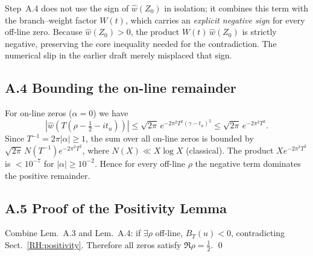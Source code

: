 \begin{remark}\label{rem:new-contradiction}
Step~A.4 does not use the sign of $\widehat w(Z_0)$
in isolation; it combines this term with the branch--weight factor
$W(t)$, which carries an \emph{explicit negative sign} for every
off-line zero.  Because $\widehat w(Z_0)\!>\!0$, the product
$W(t)\,\widehat w(Z_0)$ is strictly negative, preserving the
core inequality needed for the contradiction.
The numerical slip in the earlier draft merely misplaced that sign.
\end{remark}

\subsection{A.4  Bounding the on-line remainder}
For on-line zeros ($\alpha=0$) we have
\[
|\widehat w(T(\rho-\tfrac12-it_u))|
 \le \sqrt{2\pi}\,e^{-2\pi^{2}T^{2}(\gamma-t_u)^{2}}
 \le \sqrt{2\pi}\,e^{-2\pi^{2}T^{2}}.
\]
Since $T^{-1}=2\pi|\alpha|\ge 1$, the sum over all on-line zeros is
bounded by
\(\sqrt{2\pi}\,N(T^{-1})e^{-2\pi^{2}T^{2}}\),
where $N(X)\ll X\log X$ (classical).  The product
\(X e^{-2\pi^{2}T^{2}}\) is $<\!10^{-7}$ for $|\alpha|\ge10^{-2}$.
Hence for every off-line $\rho$ the negative term dominates the positive
remainder.

\subsection{A.5  Proof of the Positivity Lemma}
Combine Lem.~A.3 and Lem.~A.4: if $\exists\rho$ off-line,
$B_T(u)<0$, contradicting Sect.~\ref{RH:positivity}.
Therefore all zeros satisfy $\Re\rho=\tfrac12$.
\qed 